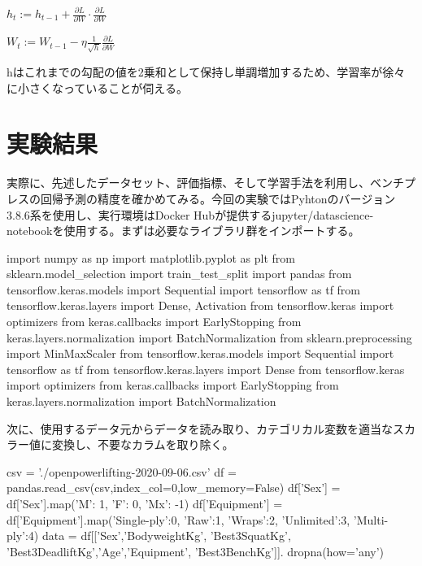 \documentclass{article}
\begin{document}
\begin{center}
\begin{math}
h_t := h_{t-1} +  \frac{\partial L}{\partial W} \cdot \frac{\partial L}{\partial W}
\end{math}
\end{center}


\begin{center}
\begin{math}
W_t := W_{t-1} - \eta \frac{1}{\sqrt{h}} \frac{\partial L}{\partial W}
\end{math}
\end{center}

hはこれまでの勾配の値を2乗和として保持し単調増加するため、学習率が徐々に小さくなっていることが伺える。


\section{実験結果}

実際に、先述したデータセット、評価指標、そして学習手法を利用し、ベンチプレスの回帰予測の精度を確かめてみる。今回の実験ではPyhtonのバージョン3.8.6系を使用し、実行環境はDocker Hubが提供するjupyter/datascience-notebookを使用する。まずは必要なライブラリ群をインポートする。
\\


\begin{python}
import numpy as np
import matplotlib.pyplot as plt
from sklearn.model_selection import train_test_split
import pandas
from tensorflow.keras.models import Sequential
import tensorflow as tf
from tensorflow.keras.layers import Dense, Activation
from tensorflow.keras import optimizers
from keras.callbacks import EarlyStopping
from keras.layers.normalization import BatchNormalization
from sklearn.preprocessing import MinMaxScaler
from tensorflow.keras.models import Sequential
import tensorflow as tf
from tensorflow.keras.layers import Dense
from tensorflow.keras import optimizers
from keras.callbacks import EarlyStopping
from keras.layers.normalization import BatchNormalization
\end{python}


次に、使用するデータ元からデータを読み取り、カテゴリカル変数を適当なスカラー値に変換し、不要なカラムを取り除く。
\\

\begin{python}
csv = './openpowerlifting-2020-09-06.csv'
df = pandas.read_csv(csv,index_col=0,low_memory=False)
df['Sex'] = df['Sex'].map({'M': 1, 'F': 0, 'Mx': -1})
df['Equipment'] = df['Equipment'].map({'Single-ply':0, 
'Raw':1, 'Wraps':2, 'Unlimited':3, 'Multi-ply':4})
data = df[['Sex','BodyweightKg', 'Best3SquatKg', 
'Best3DeadliftKg','Age','Equipment', 'Best3BenchKg']].
dropna(how='any')
\end{python}
\end{document}
